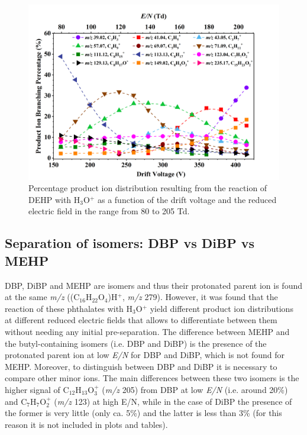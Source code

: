 \begin{figure}[htb]%
\centering
\includegraphics[height=0.4\textheight]{pics/DEHP-BR.png}
\caption{Percentage product ion distribution  resulting from the reaction of DEHP with H$_3$O$^+$ as a function of the drift voltage and the reduced electric field in the range from 80 to 205 Td.}
\label{fig:PH_DEHP_fs}
\end{figure}







\subsection{Separation of isomers: DBP vs DiBP vs MEHP }
DBP, DiBP and MEHP are isomers and thus their protonated parent ion is found at the same \textit{m/z} ((C$_{16}$H$_{22}$O$_4$)H$^+$, \textit{m/z} 279).
%
However, it was found that the reaction of these phthalates with H$_3$O$^+$ yield different product ion distributions at different reduced electric fields that allows to differentiate between them without needing any initial pre-separation.
%
The difference between MEHP and the butyl-containing isomers (i.e. DBP and DiBP)  is the presence of the protonated parent ion at low \textit{E/N} for DBP and DiBP, which is not found for MEHP.
Moreover, to distinguish between DBP and DiBP it is necessary to compare other minor ions.
%
The main differences between these two isomers is the higher signal of C$_{12}$H$_{13}$O$_3^+$ (\textit{m/z} 205) from DBP at low \textit{E/N} (i.e. around 20\%) and C$_{7}$H$_{7}$O$_2^+$ (\textit{m/z} 123) at high E/N, while in the case of DiBP the presence of the former is very little (only ca. 5\%) and the latter is less than 3\% (for this reason it is not included in plots and tables). 















